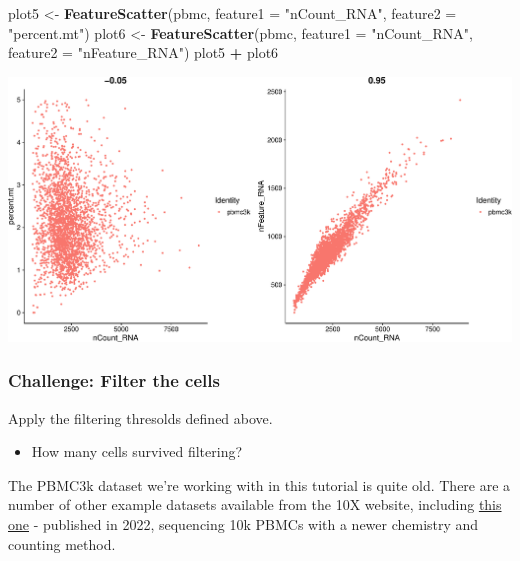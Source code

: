 \documentclass[
]{book}
\newenvironment{Shaded}{\begin{snugshade}}{\end{snugshade}}
\newcommand{\AttributeTok}[1]{\textcolor[rgb]{0.13,0.29,0.53}{#1}}
\newcommand{\FunctionTok}[1]{\textcolor[rgb]{0.13,0.29,0.53}{\textbf{#1}}}
\newcommand{\NormalTok}[1]{#1}
\newcommand{\OtherTok}[1]{\textcolor[rgb]{0.56,0.35,0.01}{#1}}
\newcommand{\SpecialCharTok}[1]{\textcolor[rgb]{0.81,0.36,0.00}{\textbf{#1}}}
\newcommand{\StringTok}[1]{\textcolor[rgb]{0.31,0.60,0.02}{#1}}
\providecommand{\tightlist}{%
  \setlength{\itemsep}{0pt}\setlength{\parskip}{0pt}}
\begin{document}
\begin{Shaded}
\begin{Highlighting}[]
\NormalTok{plot5 }\OtherTok{\textless{}{-}} \FunctionTok{FeatureScatter}\NormalTok{(pbmc, }\AttributeTok{feature1 =} \StringTok{"nCount\_RNA"}\NormalTok{, }\AttributeTok{feature2 =} \StringTok{"percent.mt"}\NormalTok{) }
\NormalTok{plot6 }\OtherTok{\textless{}{-}} \FunctionTok{FeatureScatter}\NormalTok{(pbmc, }\AttributeTok{feature1 =} \StringTok{"nCount\_RNA"}\NormalTok{, }\AttributeTok{feature2 =} \StringTok{"nFeature\_RNA"}\NormalTok{) }
\NormalTok{plot5 }\SpecialCharTok{+}\NormalTok{ plot6}
\end{Highlighting}
\end{Shaded}

\includegraphics{scRNAseqInR_Doco_files/figure-latex/qc2_sidebar-1.pdf}

\hypertarget{challenge-filter-the-cells}{%
\subsubsection*{Challenge: Filter the cells}\label{challenge-filter-the-cells}}

Apply the filtering thresolds defined above.

\begin{itemize}
\tightlist
\item
  How many cells survived filtering?
\end{itemize}

The PBMC3k dataset we're working with in this tutorial is quite old. There are a number of other example datasets available from the 10X website, including \href{https://www.10xgenomics.com/resources/datasets/10k-human-pbmcs-3-v3-1-chromium-x-with-intronic-reads-3-1-high}{this one} - published in 2022, sequencing 10k PBMCs with a newer chemistry and counting method.
\end{document}
